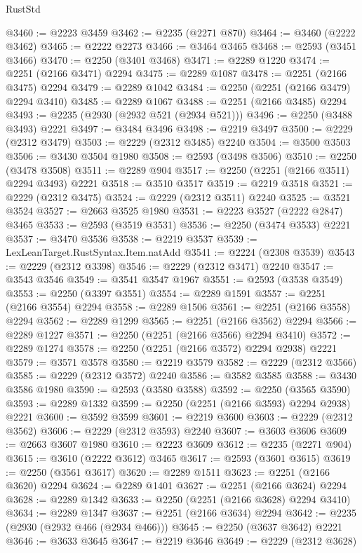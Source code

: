 \begin{lexlean}{RustStd}
\begin{coremodule}
{\begin{coremodule}
{{{{{{{{{{{{{{{{{{{{{{{{{{{{{{{{{{{{{{{{{{{{{{{{{{{{{@3460 := @2223 @3459
@3462 := @2235 (@2271 @870)
@3464 := @3460 (@2222 @3462)
@3465 := @2222 @2273
@3466 := @3464 @3465
@3468 := @2593 (@3451 @3466)
@3470 := @2250 (@3401 @3468)
@3471 := @2289 @1220
@3474 := @2251 (@2166 @3471) @2294
@3475 := @2289 @1087
@3478 := @2251 (@2166 @3475) @2294
@3479 := @2289 @1042
@3484 := @2250 (@2251 (@2166 @3479) @2294 @3410)
@3485 := @2289 @1067
@3488 := @2251 (@2166 @3485) @2294
@3493 := @2235 (@2930 (@2932 @521 (@2934 @521)))
@3496 := @2250 (@3488 @3493) @2221
@3497 := @3484 @3496
@3498 := @2219 @3497
@3500 := @2229 (@2312 @3479)
@3503 := @2229 (@2312 @3485) @2240
@3504 := @3500 @3503
@3506 := @3430 @3504 @1980
@3508 := @2593 (@3498 @3506)
@3510 := @2250 (@3478 @3508)
@3511 := @2289 @904
@3517 := @2250 (@2251 (@2166 @3511) @2294 @3493) @2221
@3518 := @3510 @3517
@3519 := @2219 @3518
@3521 := @2229 (@2312 @3475)
@3524 := @2229 (@2312 @3511) @2240
@3525 := @3521 @3524
@3527 := @2663 @3525 @1980
@3531 := @2223 @3527 (@2222 @2847) @3465
@3533 := @2593 (@3519 @3531)
@3536 := @2250 (@3474 @3533) @2221
@3537 := @3470 @3536
@3538 := @2219 @3537
@3539 := LexLeanTarget.RustSyntax.Item.natAdd
@3541 := @2224 (@2308 @3539)
@3543 := @2229 (@2312 @3398)
@3546 := @2229 (@2312 @3471) @2240
@3547 := @3543 @3546
@3549 := @3541 @3547 @1967
@3551 := @2593 (@3538 @3549)
@3553 := @2250 (@3397 @3551)
@3554 := @2289 @1591
@3557 := @2251 (@2166 @3554) @2294
@3558 := @2289 @1506
@3561 := @2251 (@2166 @3558) @2294
@3562 := @2289 @1299
@3565 := @2251 (@2166 @3562) @2294
@3566 := @2289 @1227
@3571 := @2250 (@2251 (@2166 @3566) @2294 @3410)
@3572 := @2289 @1274
@3578 := @2250 (@2251 (@2166 @3572) @2294 @2938) @2221
@3579 := @3571 @3578
@3580 := @2219 @3579
@3582 := @2229 (@2312 @3566)
@3585 := @2229 (@2312 @3572) @2240
@3586 := @3582 @3585
@3588 := @3430 @3586 @1980
@3590 := @2593 (@3580 @3588)
@3592 := @2250 (@3565 @3590)
@3593 := @2289 @1332
@3599 := @2250 (@2251 (@2166 @3593) @2294 @2938) @2221
@3600 := @3592 @3599
@3601 := @2219 @3600
@3603 := @2229 (@2312 @3562)
@3606 := @2229 (@2312 @3593) @2240
@3607 := @3603 @3606
@3609 := @2663 @3607 @1980
@3610 := @2223 @3609
@3612 := @2235 (@2271 @904)
@3615 := @3610 (@2222 @3612) @3465
@3617 := @2593 (@3601 @3615)
@3619 := @2250 (@3561 @3617)
@3620 := @2289 @1511
@3623 := @2251 (@2166 @3620) @2294
@3624 := @2289 @1401
@3627 := @2251 (@2166 @3624) @2294
@3628 := @2289 @1342
@3633 := @2250 (@2251 (@2166 @3628) @2294 @3410)
@3634 := @2289 @1347
@3637 := @2251 (@2166 @3634) @2294
@3642 := @2235 (@2930 (@2932 @466 (@2934 @466)))
@3645 := @2250 (@3637 @3642) @2221
@3646 := @3633 @3645
@3647 := @2219 @3646
@3649 := @2229 (@2312 @3628)
}}}}}}}}}}}}}}}}}}}}}}}}}}}}}}}}}}}}}}}}}}}}}}}}}}}}}
\end{coremodule}}
\end{coremodule}
\end{lexlean}
